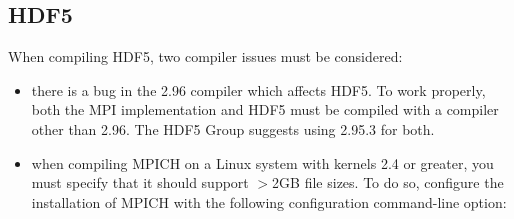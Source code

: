 %
%
%

\subsection{HDF5}
\label{app:hdf5-overview}



When compiling HDF5, two compiler issues must be considered:

\begin{itemize}
\item there is a bug in the  2.96 compiler which affects
  HDF5.  To work properly, both the MPI implementation and HDF5 must
  be compiled with a compiler other than 2.96. The HDF5 Group suggests
  using  2.95.3 for both.
  
\item when compiling MPICH on a Linux system with kernels 2.4 or
  greater, you must specify that it should support $>$2GB file sizes.
  To do so, configure the installation of MPICH with the following
  configuration command-line option:

\end{itemize}

